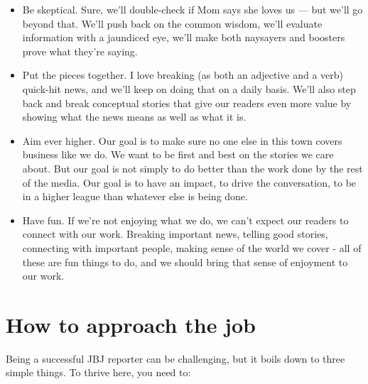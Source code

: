 \documentclass[
  11pt,
  american,
  letterpaperpaper,
  extrafontsizes,onecolumn,openright
  ]{memoir}
\begin{document}
\begin{itemize}
\item
  Be skeptical. Sure, we'll double-check if Mom says she loves us --- but we'll go beyond that. We'll push back on the common wisdom, we'll evaluate information with a jaundiced eye, we'll make both naysayers and boosters prove what they're saying.
\item
  Put the pieces together. I love breaking (as both an adjective and a verb) quick-hit news, and we'll keep on doing that on a daily basis. We'll also step back and break conceptual stories that give our readers even more value by showing what the news means as well as what it is.
\item
  Aim ever higher. Our goal is to make sure no one else in this town covers business like we do. We want to be first and best on the stories we care about. But our goal is not simply to do better than the work done by the rest of the media. Our goal is to have an impact, to drive the conversation, to be in a higher league than whatever else is being done.
\item
  Have fun. If we're not enjoying what we do, we can't expect our readers to connect with our work. Breaking important news, telling good stories, connecting with important people, making sense of the world we cover - all of these are fun things to do, and we should bring that sense of enjoyment to our work.
\end{itemize}

\hypertarget{how-to-approach-the-job}{%
\section*{How to approach the job}\label{how-to-approach-the-job}}

Being a successful JBJ reporter can be challenging, but it boils down to three simple things. To thrive here, you need to:
\end{document}
